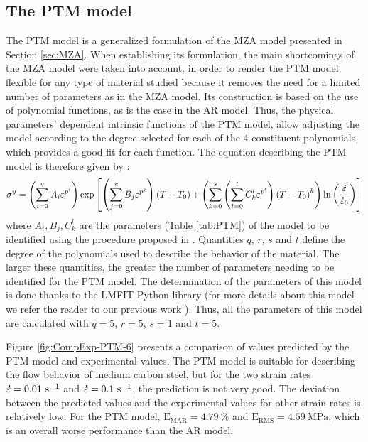 \documentclass[metals,article,submit,pdftex,moreauthors]{Definitions/mdpi}
\DeclareRobustCommand{\mdot}[1]{\accentset{\mbox{\bfseries .}}{#1}}
\DeclareRobustCommand{\RMSE}{\text{E}_\text{RMS}}
\DeclareRobustCommand{\MARE}{\text{E}_\text{MAR}}
\DeclareRobustCommand{\ps}{\text{s}^{-1}}
\DeclareRobustCommand{\MPa}{\text{MPa}}
\begin{document}
\subsection{The PTM model\label{sec:PTM}}

The PTM model \cite{TizeMha-2022} is a generalized formulation of the MZA model presented in Section \ref{sec:MZA}.
When establishing its formulation, the main shortcomings of the MZA model were taken into account, in order to render the PTM model flexible for any type of material studied because it removes the need for a limited number of parameters as in the MZA model.
Its construction is based on the use of polynomial functions, as is the case in the AR model.
Thus, the physical parameters' dependent intrinsic functions of the PTM model, allow adjusting the model according to the degree selected for each of the 4 constituent polynomials, which provides a good fit for each function.
The equation describing the PTM model is therefore given by :
\begin{equation}
\label{eq:PTM-model}
\sigma^y = \left(\sum_{i=0}^{q}{A_i\varepsilon^{p^i}}\right) \exp\left[\left(\sum_{j=0}^{r}{B_j\varepsilon^{p^j}}\right)\left(T-T_0\right) + \left(\sum_{k=0}^{s}\left(\sum_{l=0}^{t}{C_k^l\varepsilon^{p^l}} \right)\left(T-T_0\right)^k \right)\ln\left( \frac{\mdot\varepsilon}{\mdot{\varepsilon}_0}\right)\right]
\end{equation}
where $A_i, B_j, C_k^l$ are the parameters (Table \ref{tab:PTM}) of the model to be identified using the procedure proposed in \cite{TizeMha-2022}.
Quantities $q$, $r$, $s$ and $t$ define the degree of the polynomials used to describe the behavior of the material.
The larger these quantities, the greater the number of parameters needing to be identified for the PTM model.
The determination of the parameters of this model is done thanks to the LMFIT Python library \cite{Newville-2016} (for more details about this model we refer the reader to our previous work \cite{TizeMha-2022}).
Thus, all the parameters of this model are calculated with $q=5$, $r=5$, $s=1$ and $t=5$.

Figure \ref{fig:CompExp-PTM-6} presents a comparison of values predicted by the PTM model and experimental values.
The PTM model is suitable for describing the flow behavior of medium carbon steel, but for the two strain rates $\mdot\varepsilon=0.01~\ps$ and $\mdot\varepsilon=0.1~\ps$, the prediction is not very good.
The deviation between the predicted values and the experimental values for other strain rates is relatively low.
For the PTM model, $\MARE=4.79~\%$ and $\RMSE=4.59~\MPa$, which is an overall worse performance than the AR model.
\end{document}
